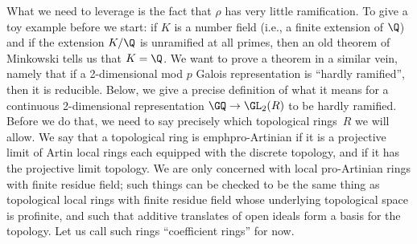 What we need to leverage is the fact that $\rho$ has very little ramification. To give
a toy example before we start: if $K$ is a number field (i.e., a finite extension of $\Q$)
and if the extension $K/\Q$ is unramified at all primes, then an old theorem of
Minkowski tells us that $K=\Q$. We want to prove a theorem in a similar vein, namely
that if a 2-dimensional mod $p$ Galois representation is ``hardly ramified'', then it is reducible.
Below, we give a precise
definition of what it means for a continuous 2-dimensional representation $\GQ\to\GL_2(R)$
to be hardly ramified. Before we do that, we need to say precisely which topological rings~$R$
we will allow. We say that a topological ring is emph{pro-Artinian} if it is a projective
limit of Artin local rings each equipped with the discrete topology, and if it has the
projective limit topology. We are only concerned with local pro-Artinian rings with finite
residue field; such things can be checked to be the same thing as topological
local rings with finite residue field whose underlying topological space is profinite,
and such that additive translates of open ideals form a basis for the topology.
Let us call such rings ``coefficient rings'' for now.

